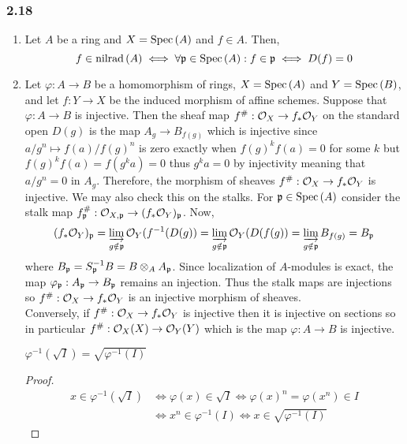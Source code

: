 \documentclass[12pt]{article}
\begin{document}
\subsubsection{2.18}

\begin{enumerate}
\item Let $A$ be a ring and $X = \mathrm{Spec}\left( A \right)$ and $f \in A$. Then,
\[ f \in \mathrm{nilrad}\left( A \right) \iff \forall \mathfrak{p} \in \mathrm{Spec}\left( A \right) : f \in \mathfrak{p} \iff D(f) = 0 \]

\renewcommand{\P}{\mathfrak{P}}

\item Let $\varphi : A \to B$ be a homomorphism of rings, $X = \mathrm{Spec}\left( A \right)$ and $Y = \mathrm{Spec}\left( B \right)$, and let $f : Y \to X$ be the induced morphism of affine schemes. Suppose that $\varphi : A \to B$ is injective. Then the sheaf map $f^\# : \mathcal{O}_{X} \to f_* \mathcal{O}_{Y}$ on the standard open $D(g)$ is the map $A_g \to B_{f(g)}$ which is injective since $a / g^n \mapsto f(a) / f(g)^n$ is zero exactly when $f(g)^k f(a) = 0$ for some $k$ but $f(g)^k f(a) = f(g^k a) = 0$ thus $g^k a = 0$ by injectivity meaning that $a / g^n = 0$ in $A_g$. Therefore, the morphism of sheaves $f^\# : \mathcal{O}_{X} \to f_* \mathcal{O}_{Y}$ is injective. We may also check this on the stalks. For $\mathfrak{p} \in \mathrm{Spec}\left( A \right)$ consider the stalk map $f^\#_{\mathfrak{p}} : \mathcal{O}_{X, \mathfrak{p}} \to (f_* \mathcal{O}_{Y})_{\mathfrak{p}}$. Now,
\[ (f_* \mathcal{O}_{Y})_{\mathfrak{p}} = \varinjlim_{g \notin \mathfrak{p}} \mathcal{O}_{Y}(f^{-1}(D(g)) = \varinjlim_{g \notin \mathfrak{p}} \mathcal{O}_{Y}(D(f(g)) = \varinjlim_{g \notin \mathfrak{p}} B_{f(g)} = B_{\mathfrak{p}} \]
where $B_{\mathfrak{p}} = S_{\mathfrak{p}}^{-1} B = B \otimes_A A_{\mathfrak{p}}$. Since localization of $A$-modules is exact, the map $\varphi_{\mathfrak{p}} : A_{\mathfrak{p}} \to B_{\mathfrak{p}}$ remains an injection. Thus the stalk maps are injections so $f^\# : \mathcal{O}_{X} \to f_* \mathcal{O}_{Y}$ is an injective morphism of sheaves.
\bigskip\\
Conversely, if $f^\# : \mathcal{O}_{X} \to f_* \mathcal{O}_{Y}$ is injective then it is injective on sections so in particular $f^\# : \mathcal{O}_{X}(X) \to \mathcal{O}_{Y}(Y)$ which is the map $\varphi : A \to B$ is injective.
\bigskip\\
\begin{lemma}
$\varphi^{-1}(\sqrt{I}) = \sqrt{\varphi^{-1}(I)}$
\end{lemma}
\begin{proof}
\begin{align*}
x \in \varphi^{-1}(\sqrt{I}) & \iff \varphi(x) \in \sqrt{I} \iff \varphi(x)^n = \varphi(x^n) \in I
\\
&  \iff x^n \in \varphi^{-1}(I) \iff x \in \sqrt{\varphi^{-1}(I)} 
\end{align*}

\end{proof}
\end{enumerate}
\end{document}
